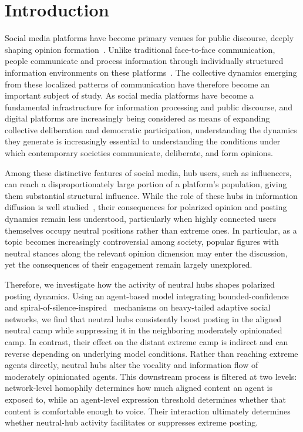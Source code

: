 \documentclass{svproc}
\def\Black{\color[rgb]{0,0,0}}
\begin{document}
\begin{abstract}
\Black
{} 
\end{abstract}


\section{Introduction}\label{sec:intro}
Social media platforms have become primary venues for public
discourse, deeply shaping opinion formation~\cite{ortiz-ospina2019}. Unlike traditional
face-to-face communication, people communicate and process information
through individually structured information environments on these
platforms~\cite{bakshy2015}. The collective dynamics emerging from these localized
patterns of communication have therefore become an important subject
of study. As social media platforms have become a fundamental
infrastructure for information processing and public discourse, 
and digital platforms are increasingly being considered as means 
of expanding collective deliberation and democratic participation, 
understanding the dynamics they generate is increasingly essential to
understanding the conditions under which contemporary societies
communicate, deliberate, and form opinions.
\par

Among these distinctive features of social media, hub users, such as
influencers, can reach a disproportionately large portion of a
platform's population, giving them substantial structural
influence. While the role of these hubs in information diffusion is
well studied~\cite{kwak2010,bakshy2011,betts2023}, their 
consequences for polarized opinion and posting dynamics remain
less understood, particularly when highly connected users themselves
occupy neutral positions rather than extreme ones. In particular, as
a topic becomes increasingly controversial among society, popular figures with
neutral stances along the relevant opinion dimension may enter the
discussion, yet the consequences of their engagement remain largely
unexplored.
\par


Therefore, we investigate how the activity of neutral hubs shapes
polarized posting dynamics. Using an agent-based model integrating
bounded-confidence~\cite{deffuant2000,hegselmann2002} and
spiral-of-silence-inspired~\cite{noelle-neumann1974} mechanisms on 
heavy-tailed adaptive social networks, we find that neutral hubs
consistently boost posting in the aligned neutral camp while
suppressing it in the neighboring moderately opinionated camp. In contrast,
their effect on the distant extreme camp is indirect and can reverse
depending on underlying model conditions. 
Rather than reaching extreme agents
directly, neutral hubs alter the vocality and information flow of
moderately opinionated agents. This downstream process is filtered at two
levels: network-level homophily determines how much aligned
content an agent is exposed to, while an agent-level expression
threshold determines whether that content is comfortable enough to
voice. Their interaction
ultimately determines whether neutral-hub activity facilitates or
suppresses extreme posting.
\par
\end{document}
